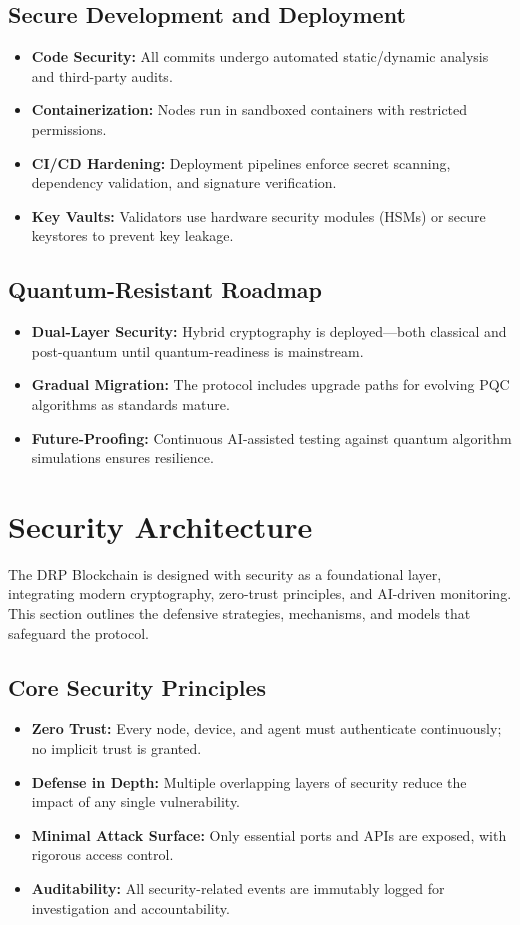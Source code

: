 \documentclass[11pt,a4paper]{article}
\begin{document}
\subsection{Secure Development and Deployment}
\begin{itemize}
    \item \textbf{Code Security:} All commits undergo automated static/dynamic analysis and third-party audits.  
    \item \textbf{Containerization:} Nodes run in sandboxed containers with restricted permissions.  
    \item \textbf{CI/CD Hardening:} Deployment pipelines enforce secret scanning, dependency validation, and signature verification.  
    \item \textbf{Key Vaults:} Validators use hardware security modules (HSMs) or secure keystores to prevent key leakage.  
\end{itemize}

\subsection{Quantum-Resistant Roadmap}
\begin{itemize}
    \item \textbf{Dual-Layer Security:} Hybrid cryptography is deployed—both classical and post-quantum until quantum-readiness is mainstream.  
    \item \textbf{Gradual Migration:} The protocol includes upgrade paths for evolving PQC algorithms as standards mature.  
    \item \textbf{Future-Proofing:} Continuous AI-assisted testing against quantum algorithm simulations ensures resilience.  
\end{itemize}

\section{Security Architecture}

The DRP Blockchain is designed with security as a foundational layer, integrating modern cryptography, zero-trust principles, and AI-driven monitoring. This section outlines the defensive strategies, mechanisms, and models that safeguard the protocol.

\subsection{Core Security Principles}
\begin{itemize}
    \item \textbf{Zero Trust:} Every node, device, and agent must authenticate continuously; no implicit trust is granted.  
    \item \textbf{Defense in Depth:} Multiple overlapping layers of security reduce the impact of any single vulnerability.  
    \item \textbf{Minimal Attack Surface:} Only essential ports and APIs are exposed, with rigorous access control.  
    \item \textbf{Auditability:} All security-related events are immutably logged for investigation and accountability.  
\end{itemize}
\end{document}
